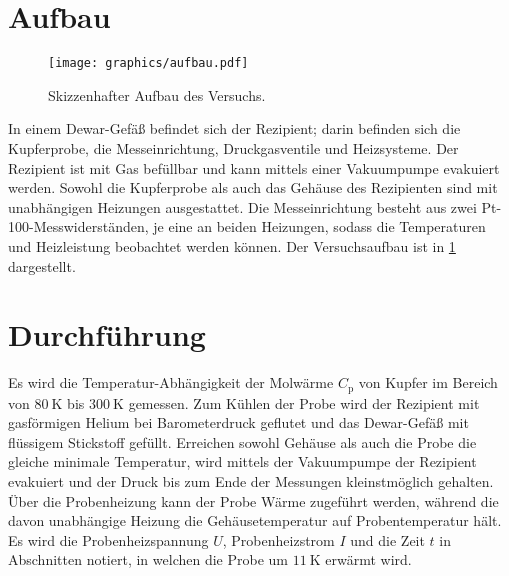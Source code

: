 \section{Aufbau}
\begin{figure}
	\texttt{[image: graphics/aufbau.pdf]}
	\caption{Skizzenhafter Aufbau des Versuchs. \cite{skript}}
	\label{fig:aufbau}
\end{figure}
In einem Dewar-Gefäß befindet sich der Rezipient; 
darin befinden sich die Kupferprobe, die Messeinrichtung, Druckgasventile und Heizsysteme.
Der Rezipient ist mit Gas befüllbar und kann mittels einer Vakuumpumpe evakuiert werden. 
Sowohl die Kupferprobe als auch das Gehäuse des Rezipienten sind mit unabhängigen Heizungen ausgestattet.
Die Messeinrichtung besteht aus zwei Pt-100-Messwiderständen, 
je eine an beiden Heizungen, 
sodass die Temperaturen und Heizleistung beobachtet werden können.
Der Versuchsaufbau ist in \ref{fig:aufbau} dargestellt.


\section{Durchführung}
Es wird die Temperatur-Abhängigkeit der Molwärme $C_\text{p}$ von Kupfer im
Bereich von $\SI{80}{\kelvin}$ bis $\SI{300}{\kelvin}$ gemessen. 
Zum Kühlen der Probe wird der Rezipient mit gasförmigen Helium bei Barometerdruck geflutet 
und das Dewar-Gefäß mit flüssigem Stickstoff gefüllt.
Erreichen sowohl Gehäuse als auch die Probe die gleiche minimale Temperatur, 
wird mittels der Vakuumpumpe der Rezipient evakuiert und der Druck bis zum Ende der Messungen kleinstmöglich gehalten.
Über die Probenheizung kann der Probe Wärme zugeführt werden, 
während die davon unabhängige Heizung die Gehäusetemperatur auf Probentemperatur hält.
Es wird die Probenheizspannung $U$, Probenheizstrom $I$ und die Zeit $t$ in Abschnitten notiert, 
in welchen die Probe um $\SI{11}{\kelvin}$ erwärmt wird.